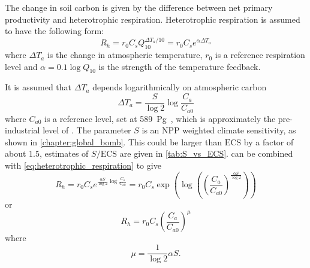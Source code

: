 The change in soil carbon is given by the difference between net primary productivity and heterotrophic respiration. Heterotrophic
respiration is assumed to have the following form:
\begin{equation}
  \label{eq:heterotrophic_respiration}
  R_h = r_0 C_s Q_{10}^{\Delta T_a/10} = r_0 C_s e^{\alpha \Delta T_a}
\end{equation}
where $\Delta T_a$ is the change in atmospheric temperature, $r_0$ is a reference respiration level and $\alpha = 0.1\log Q_{10}$ is the strength of the temperature feedback.

It is assumed that $\Delta T_a$ depends logarithmically on atmospheric carbon
\begin{equation}
  \label{eq:air_temperature}
  \Delta T_a = \frac{S}{\log 2} \log \frac{C_a}{C_{a0}}
\end{equation}
where $C_{a0}$ is a reference  level, set at \SI{589}{\peta\gram\carbon}, which is approximately the pre-industrial
level of  \parencite{Lade2018}. The parameter $S$ is an NPP weighted climate sensitivity, as shown in
\cref{chapter:global_bomb}. This could be larger than $\mathrm{ECS}$ by a factor of about $1.5$, estimates of $S/\mathrm{ECS}$ are given
in \cref{tab:S_vs_ECS}.  can be combined with \cref{eq:heterotrophic_respiration} to give
\begin{equation}
  R_h = r_0 C_s e^{\frac{\alpha S}{\log 2} \log \frac{C_a}{C_{a0}}} = r_0 C_s \exp\left(\log \left( \left(\frac{C_a}{C_{a0}}\right)^{\frac{\alpha S}{\log 2}}\right)\right)
\end{equation}
or
\begin{equation}
  \label{eq:heterotrophic_respiration_combined}
  R_h = r_0 C_s \left( \frac{C_a}{C_{a0}}\right)^{\mu}
\end{equation}
where
\begin{equation}
  \label{eq:mu}
  \mu = \frac{1}{\log 2} \alpha S.
\end{equation}


